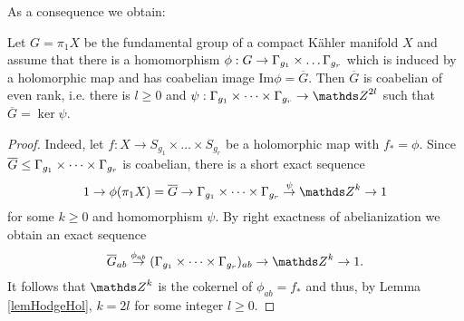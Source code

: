 As a consequence we obtain:
\begin{lemma}
 Let $G=\pi_1 X$ be the fundamental group of a compact K\"ahler manifold $X$ and assume that there is a homomorphism $\phi: G \rightarrow \Gamma_{g_1}\times \dots \Gamma_{g_r}$ which is induced by a holomorphic map and has coabelian image $\mathrm{Im}\phi = \overline{G}$. Then $\overline{G}$ is coabelian of even rank, i.e. there is $l\geq 0$ and $\psi: \G_{g_1}\times \dots \times \G_{g_r}\rightarrow \ZZ^{2l}$ such that $\overline{G}=\ker \psi$.
 \label{corNewCoab}
\end{lemma}
\begin{proof}
 Indeed, let $f: X \rightarrow S_{g_1}\times \dots \times S_{g_r}$ be a holomorphic map with $f_{\ast}=\phi$. Since $\overline{G}\leq \Gamma_{g_1}\times \dots \times \Gamma_{g_r}$ is coabelian, there is a short exact sequence
 \[
    1 \rightarrow \phi(\pi_1 X)=\overline{G} \rightarrow \G_{g_1}\times \dots \times \G_{g_r}\stackrel{\psi}{\rightarrow} \ZZ^k\rightarrow 1
 \]
 for some $k\geq 0$ and homomorphism $\psi$. By right exactness of abelianization we obtain an exact sequence
 \[
  \overline{G}_{ab}\stackrel{\phi_{ab}}{\rightarrow} (\G_{g_1}\times \dots \times \G_{g_r})_{ab}\rightarrow \ZZ^k \rightarrow 1.
 \] 
 It follows that $\ZZ^k$ is the cokernel of $\phi_{ab} =f_{\ast}$ and thus, by Lemma \ref{lemHodgeHol}, $k=2l$ for some integer $l\geq 0$. 
\end{proof}

